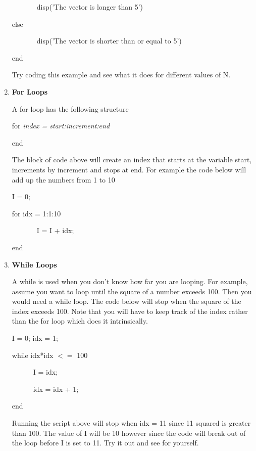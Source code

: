 \begin{enumerate}
\begin{framed}
~~~~~~~disp('The vector is longer than 5')

else

~~~~~~~disp('The vector is shorter than or equal to 5')

end

\end{framed}

Try coding this example and see what it does for different values of N.

\item \textbf{For Loops}

A for loop has the following structure

for {\it index = start:increment:end}


end

The block of code above will create an index that starts at the
variable start, increments by increment and stops at end. For
example the code below will add up the numbers from 1 to 10

\begin{framed}
I = 0;

for idx = 1:1:10

~~~~~~~I = I + idx;

end

\end{framed}

\item \textbf{While Loops}

A while is used when you don't know how far you are looping. For
example, assume you want to loop until the square of a number exceeds
100. Then you would need a while loop. The code below will stop when
the square of the index exceeds 100. Note that you will have to keep
track of the index rather than the for loop which does it
intrinsically.

\begin{framed}

I = 0;
idx = 1;

while idx*idx $<=$ 100

~~~~~~I = idx;

~~~~~~idx = idx + 1;

end

\end{framed}

Running the script above will stop when idx = 11 since 11 squared is
greater than 100. The value of I will be 10 however since the code
will break out of the loop before I is set to 11. Try it out and see
for yourself.



\end{enumerate}
